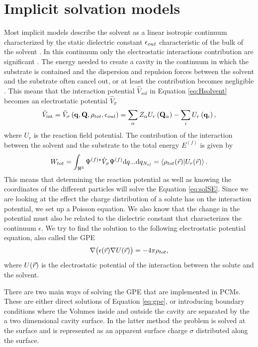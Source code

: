 \documentclass[../master_thesis.tex]{subfiles}
\begin{document}
\section{Implicit solvation models}
Most implicit models describe the solvent as a linear isotropic continuum
characterized by the static dielectric constant $\epsilon_{out}$ characteristic
of the bulk of the solvent \cite{Tomasi:1994wt, FossoTande:2013ka}. In this continuum
only the electrostatic interactions contribution are significant \cite{Tomasi:1994wt}.
The energy needed to create a cavity in the continuum in which the substrate is
contained and the dispersion and repulsion forces between the solvent and the
substrate often cancel out, or at least the contribution becomes negligible
\cite{Cramer:2004}. This means that the interaction potential $\hat{V}_{sol}$
in Equation \ref{eq:Hsolvent} becomes an electrostatic potential $\hat{V}_{\sigma}$
\cite{Tomasi:1994wt}
\begin{equation}
  \hat{V}_{\mathrm{int}}=\hat{V}_{\sigma}\left(\mathbf{q}, \mathbf{Q},
  \rho_{tot}, \epsilon_{out}\right)=\sum_{\alpha} Z_{\alpha} U_r
  \left(\mathbf{Q}_{\alpha}\right)-\sum_{i} U_r\left(\mathbf{q}_{i}\right),
\end{equation}
where $U_r$ is the reaction field potential.
The contribution of the interaction between the solvent and the substrate to the total energy
$E^{(f)}$ is given by
\begin{equation}
  W_{tot} = \int_{\real^3}\Psi^{(f)\star}\hat{V}_{\sigma}\Psi^{(f)}\text{d}q...\text{d}q_{N_{el}}
  = \braket{\rho_{tot}(\rvec)|U_r(\rvec)}.
\end{equation}
This means that determining the reaction potential as well as knowing the coordinates
of the different particles will solve the Equation \ref{eq:solSE}.
Since we are looking at the effect the charge distribution of a solute has on
the interaction potential, we set up a Poisson equation. We also know that the change in
the potential must also be related to the dielectric constant that characterizes
the continuum $\epsilon$. We try to find the solution to the following
electrostatic potential equation, also called the \ac{GPE}
\begin{equation}\label{eq:gpe}
  \nabla\big( \epsilon(\vec{r}) \nabla U(\vec{r})\big) = -4\pi\rho_{tot},
\end{equation}
where $U(\vec{r})$ is the electrostatic potential of the interaction between
the solute and the solvent.

There are two main ways of solving the \ac{GPE} that are implemented in \acp{PCM}.
These are either direct solutions of Equation \ref{eq:gpe}, or introducing boundary conditions
where the Volumes inside and outside the cavity are separated by the a two dimensional
cavity surface. In the latter method the problem is solved at the surface and is represented
as an apparent surface charge $\sigma$ distributed along the surface.
\end{document}
